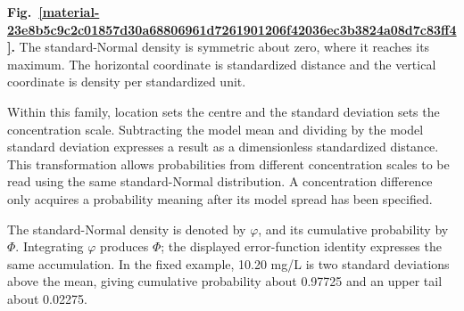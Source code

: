 \documentclass[11pt,a4paper]{article}
\begin{document}
\par\medskip
\Needspace{10cm}
\label{material-23e8b5c9c2c01857d30a68806961d7261901206f42036ec3b3824a08d7c83ff4}
\noindent\textbf{Fig.~\ref*{material-23e8b5c9c2c01857d30a68806961d7261901206f42036ec3b3824a08d7c83ff4}.} The standard-Normal density is symmetric about zero, where it reaches its maximum. The horizontal coordinate is standardized distance and the vertical coordinate is density per standardized unit.\par\nopagebreak
\begin{center}
\end{center}

\medskip

Within this family, location sets the centre and the standard deviation sets the concentration scale. Subtracting the model mean and dividing by the model standard deviation expresses a result as a dimensionless standardized distance. This transformation allows probabilities from different concentration scales to be read using the same standard-Normal distribution. A concentration difference only acquires a probability meaning after its model spread has been specified.


The standard-Normal density is denoted by \(\varphi\), and its cumulative probability by \(\Phi\). Integrating \(\varphi\) produces \(\Phi\); the displayed error-function identity expresses the same accumulation. In the fixed example, 10.20 mg/L is two standard deviations above the mean, giving cumulative probability about 0.97725 and an upper tail about 0.02275.
\end{document}
